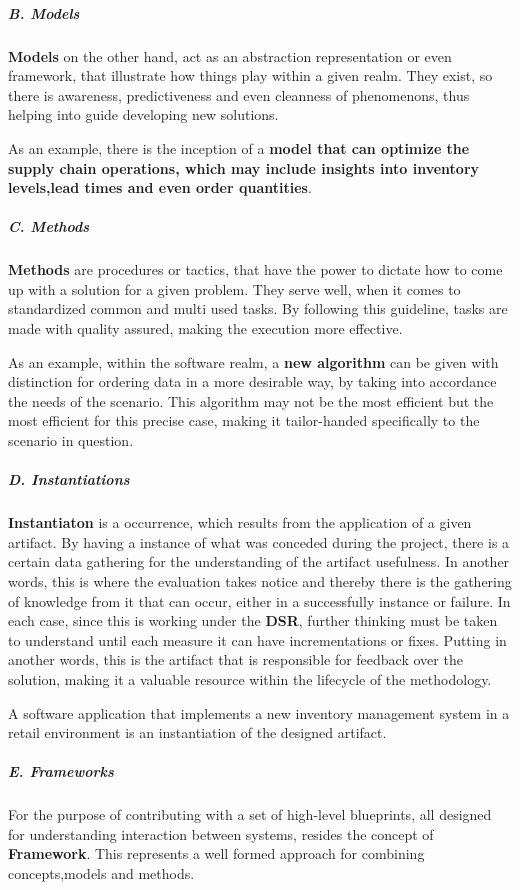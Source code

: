 \subparagraph{B. Models}\mbox{}

\textbf{Models} on the other hand, act as an abstraction representation or even framework, that illustrate how things play within a given realm. They exist, so there is awareness, predictiveness and even cleanness of phenomenons, thus helping into guide developing new solutions.

As an example, there is the inception of a \textbf{model that can optimize the supply chain operations, which may include insights into inventory levels,lead times and even order quantities}.

\subparagraph{C. Methods}\mbox{}

\textbf{Methods} are procedures or tactics, that have the power to dictate how to come up with a solution for a given problem. They serve well, when it comes to standardized common and multi used tasks. By following this guideline, tasks are made with quality assured, making the execution more effective.

As an example, within the software realm, a \textbf{new algorithm} can be given with distinction for ordering data in a more desirable way, by taking into accordance the needs of the scenario. This algorithm may not be the most efficient but the most efficient for this precise case, making it tailor-handed specifically to the scenario in question.

\subparagraph{D. Instantiations}\mbox{}

\textbf{Instantiaton} is a occurrence, which results from the application of a given artifact. By having a instance of what was conceded during the project, there is a certain data gathering for the understanding of the artifact usefulness. In another words, this is where the evaluation takes notice and thereby there is the gathering of knowledge from it that can occur, either in a successfully instance or failure. In each case, since this is working under the \textbf{DSR}, further thinking must be taken to understand until each measure it can have incrementations or fixes. Putting in another words, this is the artifact that is responsible for feedback over the solution, making it a valuable resource within the lifecycle of the methodology.

A software application that implements a new inventory management system in a retail environment is an instantiation of the designed artifact.


\subparagraph{E. Frameworks}\mbox{}

For the purpose of contributing with a set of high-level blueprints, all designed for understanding interaction between systems, resides the concept of \textbf{Framework}. This represents a well formed approach for combining concepts,models and methods.

